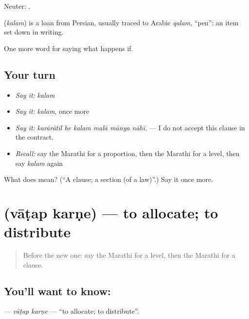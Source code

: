 Neuter:  .

\begin{cousinweb}
\textbf{} (\emph{kalam}) is a loan from Persian, usually traced to Arabic \emph{qalam}, \textquotedblleft{}pen\textquotedblright{}: an item set down in writing.
\end{cousinweb}

\begin{grammarlens}[title={What you've built}]
One more word for saying what happens if.
\end{grammarlens}

\subsection*{Your turn}
\begin{itemize}
\raggedright
  \item \emph{Say it:} \emph{kalam}
  \item \emph{Say it:} \emph{kalam}, once more
  \item \emph{Say it:} \emph{karārātīl he kalam malā mānya nāhī.} — I do not accept this clause in the contract.
  \item \emph{Recall:} say the Marathi for a proportion, then the Marathi for a level, then say \emph{kalam} again
\end{itemize}

\begin{tcolorbox}[breakable,colback=teal!4,colframe=teal!35!black,title={Before you move on}]
What does  mean? (\textquotedblleft{}A clause; a section (of a law)\textquotedblright{}.) Say it once more.
\end{tcolorbox}
\section[\texorpdfstring{\mr{वाटप} \mr{करणे} (vāṭap karṇe)}{वाटप करणे (vāṭap karṇe)}]{  (vāṭap karṇe) — to allocate; to distribute}

\label{lesson:MR-C392-vatap-karne}



\begin{quote}
Before the new one: say the Marathi for a level, then the Marathi for a clause.
\end{quote}

\subsection*{You'll want to know:  }
\textbf{ } — \emph{vāṭap karṇe} — \textquotedblleft{}to allocate; to distribute\textquotedblright{}.

